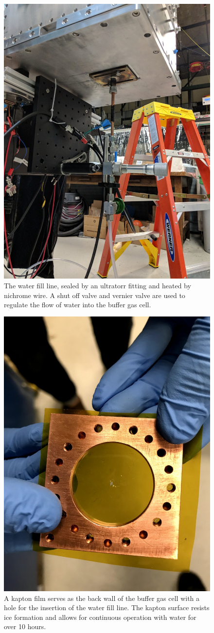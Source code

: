 \documentclass[a4paper]{article}
\begin{document}
\begin{figure}[H]
\centering
\includegraphics[width=.7\textwidth]{apparatus_water_fill_outside.jpg}
\caption{The water fill line, sealed by an ultratorr fitting and heated by nichrome wire. A shut off valve and vernier valve are used to regulate the flow of water into the buffer gas cell.}
\label{f: outside}
\end{figure}

\begin{figure}[H]
\centering
\includegraphics[width=.7\textwidth]{apparatus_kapton.jpg}
\caption{A kapton film serves as the back wall of the buffer gas cell with a hole for the insertion of the water fill line. The kapton surface resists ice formation and allows for continuous operation with water for over 10 hours.}
\label{f: kapton}
\end{figure}
\end{document}
